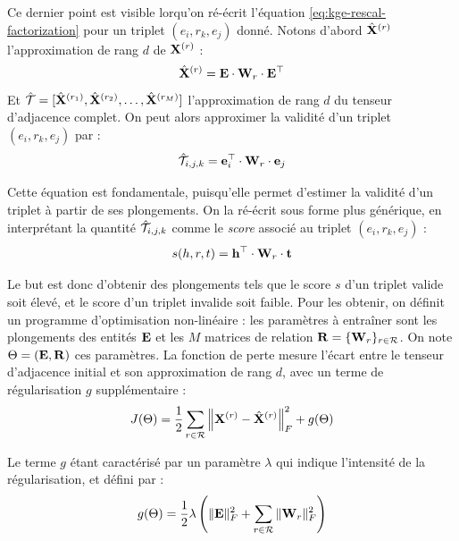 Ce dernier point est visible lorqu'on ré-écrit l'équation \ref{eq:kge-rescal-factorization} pour un triplet $(e_i, r_k, e_j)$ donné. Notons d'abord $\hat{\bf{X}}^{(r)}$ l'approximation de rang $d$ de $\bf{X}^{(r)}$ :
\begin{equation*}
    \hat{\bf{X}}^{(r)} = \bf{E} \cdot \bf{W}_r \cdot \bf{E}^\top
\end{equation*}
Et $\hat{\cal{T}} = [\hat{\bf{X}}^{(r_1)}, \hat{\bf{X}}^{(r_2)}, \ldots, \hat{\bf{X}}^{(r_M)}]$ l'approximation de rang $d$ du tenseur d'adjacence complet. On peut alors approximer la validité d'un triplet $(e_i, r_k, e_j)$ par :
\begin{equation}
    \hat{\cal{T}}_{i, j, k} = \bf{e}_i^\top \cdot \bf{W}_r \cdot \bf{e}_j
\end{equation}

Cette équation est fondamentale, puisqu'elle permet d'estimer la validité d'un triplet à partir de ses plongements. On la ré-écrit sous forme plus générique, en interprétant la quantité $\hat{\cal{T}}_{i, j, k}$ comme le \textit{score} associé au triplet $(e_i, r_k, e_j)$ : 
\begin{equation}
    s(h, r, t) = \mathbf{h}^\top \cdot \bf{W}_r \cdot \bf{t}
    \label{eq:rescal}
\end{equation}

Le but est donc d'obtenir des plongements tels que le score $s$ d'un triplet valide soit élevé, et le score d'un triplet invalide soit faible. Pour les obtenir, on définit un programme d'optimisation non-linéaire : les paramètres à entraîner sont les plongements des entités $\bf{E}$ et les $M$ matrices de relation $\bf{R} = \{ \bf{W}_r \}_{r \in \Rel}$. On note $\Theta = (\bf{E}, \bf{R})$ ces paramètres. La fonction de perte mesure l'écart entre le tenseur d'adjacence initial et son approximation de rang $d$, avec un terme de régularisation $g$ supplémentaire :
\begin{equation}
    J(\Theta) = \frac{1}{2} \sum_{r \in \Rel} \left\| \bf{X}^{(r)} - \hat{\bf{X}}^{(r)} \right\|_F^2 + g(\Theta)
    \label{eq:kge-rescal-loss-function}
\end{equation}

Le terme $g$ étant caractérisé par un paramètre $\lambda$ qui indique l'intensité de la régularisation, et défini par :
\begin{equation}
    g(\Theta) = \frac{1}{2} \lambda \left( \| \bf{E} \|_F^2 + \sum_{r \in \Rel} \| \bf{W}_r \|_F^2 \right)
\end{equation}


